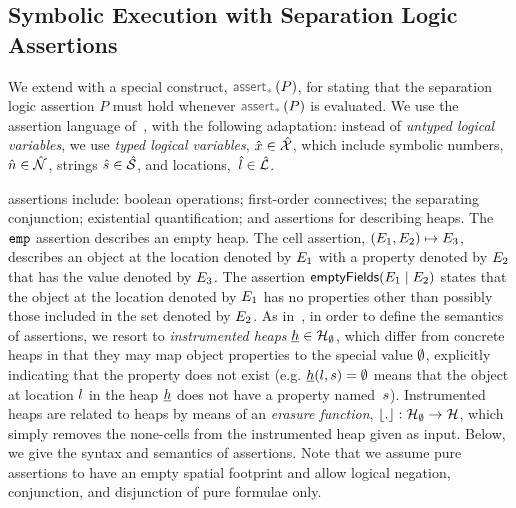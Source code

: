 \subsection{\jsil Symbolic Execution with Separation Logic Assertions}
\label{subsec:sep:assertions}

We extend \jsil with a special construct, $\sepassert(P)$, for stating that 
the separation logic assertion $P$ must hold whenever $\sepassert(P)$ is evaluated. 
We use the assertion language of~\cite{javert}, with the following adaptation:
instead of \emph{untyped logical variables}, we 
use \emph{typed logical variables}, $\hat{x} \in \hat{\mathcal{X}}$, which include 
symbolic numbers, $\hat{n} \in \hat{\mathcal{N}}$, strings $\hat{s} \in \hat{\mathcal{S}}$, 
and locations,~$\hat{l} \in \hat{{\mathcal L}}$. 

\jsil assertions include: boolean operations; first-order connectives; the separating conjunction; 
existential quantification; and assertions for describing heaps. The $\texttt{emp}$ assertion describes 
an empty heap. The cell assertion, $(E_1,E_2) \mapsto E_3$,  describes an object 
at the location denoted by $E_1$ with a property denoted by $E_2$ that has the value 
denoted by $E_3$. The assertion $\mathsf{emptyFields}(E_1 \mid E_2)$ states that the object at 
the location denoted by $E_1$ has no properties other than possibly those included in the
set denoted by $E_2$. 
%
As in~\cite{gardner:popl:2012,javert}, in order to define the semantics of assertions, 
we resort to \emph{instrumented heaps} $\underline{h} \in {\mathcal H}_\emptyset$, which differ from 
concrete heaps in that they may map object properties to the special value $\emptyset$, 
explicitly indicating that the property does not exist (e.g. $\underline{h}(l, s) = \emptyset$
means that the object at location $l$ in the heap $\underline{h}$ does not have a property
named~$s$). 
Instrumented heaps are related to heaps by means of an \emph{erasure 
function}, $\lfloor . \rfloor: {\mathcal H}_\emptyset \rightarrow {\mathcal H}$, %
which simply removes the none-cells from the instrumented heap given as input.  Below, we give the syntax and semantics of \jsil assertions. Note that we assume pure assertions to have an empty spatial footprint and allow logical negation, conjunction, and disjunction of pure formulae only.

